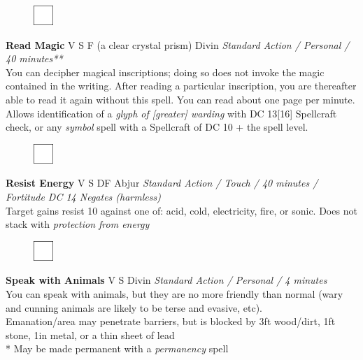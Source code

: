 \documentclass[letterpaper]{article}
\newcommand{\spell}[7]{
\begin{figure}
\vspace{-13pt}
\ifstrequal{#2}{Full}{\includegraphics[width=2em]{Checkbox-Full}}{
                      \includegraphics[width=2em]{Checkbox}}
\ifstrequal{#7}{}{\vspace{-1em}}{\vspace{#7}}
\end{figure}
\noindent \textbf{#1} #3 {
    \ifstrequal{#4}{Conj}{\color{Plum}Conj}{%
    \ifstrequal{#4}{Divin}{\color{YellowOrange}Divin}{%
    \ifstrequal{#4}{Ench}{\color{VioletRed}Ench}{%
    \ifstrequal{#4}{Trans}{\color{LimeGreen}Trans}{%
    \ifstrequal{#4}{Evoc}{\color{RedOrange}Evoc}{%
    \ifstrequal{#4}{Illu}{\color{ProcessBlue}Illu}{%
    \ifstrequal{#4}{Abjur}{\color{CadetBlue}Abjur}{%
    \ifstrequal{#4}{Necro}{\color{Red}Necro}{%
}}}}}}}}}
{\footnotesize \emph{#5}} \\
#6
}
\begin{document}
\spell{Read Magic}{}{V S F (a clear crystal prism)}{Divin}{Standard Action / Personal / 40 minutes**}{%
You can decipher magical inscriptions; doing so does not invoke the magic contained in the writing.  After reading a particular inscription, you are thereafter able to read it again without this spell.  You can read about one page per minute. Allows identification of a \emph{glyph of [greater] warding} with DC 13[16] Spellcraft check, or any \emph{symbol} spell with a Spellcraft of DC 10 + the spell level.}{1em}

\spell{Resist Energy}{}{V S DF}{Abjur}{Standard Action / Touch / 40 minutes / Fortitude DC 14 Negates (harmless)}{%
Target gains resist 10 against one of: acid, cold, electricity, fire, or sonic. Does not stack with \emph{protection from energy} }{}\\[-2em]

\spell{Speak with Animals}{}{V S}{Divin}{Standard Action / Personal / 4 minutes}{%
You can speak with animals, but they are no more friendly than normal (wary and cunning animals are likely to be terse and evasive, etc).}{}\\

\noindent * Emanation/area may penetrate barriers, but is blocked by 3ft wood/dirt, 1ft stone, 1in metal, or a thin sheet of lead \\
\noindent** May be made permanent with a \emph{permanency} spell
\end{document}
